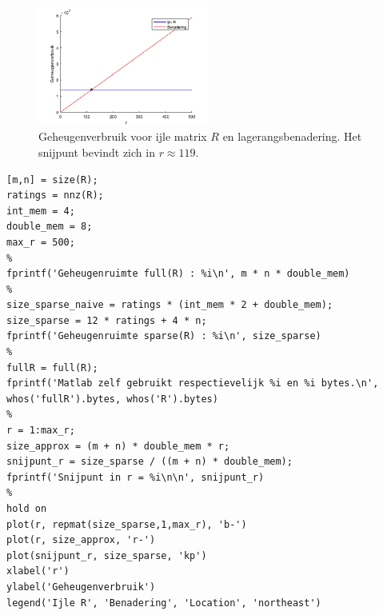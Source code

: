 \begin{figure}[h]
\centering
\includegraphics[width=0.5\textwidth]{res/op2.png}
\caption{Geheugenverbruik voor ijle matrix $R$ en lagerangsbenadering. Het snijpunt bevindt zich in $r\approx 119$.}
\label{fig:op2}
\end{figure}

\begin{lstlisting}
[m,n] = size(R);
ratings = nnz(R);
int_mem = 4;
double_mem = 8;
max_r = 500;
%
fprintf('Geheugenruimte full(R) : %i\n', m * n * double_mem)
%
size_sparse_naive = ratings * (int_mem * 2 + double_mem);
size_sparse = 12 * ratings + 4 * n;
fprintf('Geheugenruimte sparse(R) : %i\n', size_sparse)
%
fullR = full(R);
fprintf('Matlab zelf gebruikt respectievelijk %i en %i bytes.\n', whos('fullR').bytes, whos('R').bytes)
%
r = 1:max_r;
size_approx = (m + n) * double_mem * r;
snijpunt_r = size_sparse / ((m + n) * double_mem);
fprintf('Snijpunt in r = %i\n\n', snijpunt_r)
%
hold on
plot(r, repmat(size_sparse,1,max_r), 'b-')
plot(r, size_approx, 'r-')
plot(snijpunt_r, size_sparse, 'kp')
xlabel('r')
ylabel('Geheugenverbruik')
legend('Ijle R', 'Benadering', 'Location', 'northeast') 
\end{lstlisting}












